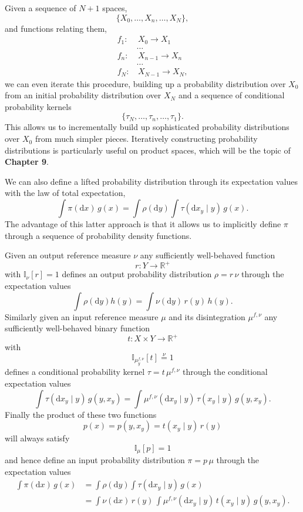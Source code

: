 \documentclass[
  letterpaper,
  DIV=11,
  numbers=noendperiod]{scrartcl}
\begin{document}
Given a sequence of \(N + 1\) spaces, \[
\{ X_{0}, \ldots, X_{n}, \ldots, X_{N} \},
\] and functions relating them, \begin{align*}
f_{1} :& \, X_{0} \rightarrow X_{1}
\\
&\ldots
\\
f_{n} :& \, X_{n - 1} \rightarrow X_{n}
\\
&\ldots
\\
f_{N} :& \, X_{N - 1} \rightarrow X_{N},
\end{align*} we can even iterate this procedure, building up a
probability distribution over \(X_{0}\) from an initial probability
distribution over \(X_{N}\) and a sequence of conditional probability
kernels \[
\{ \tau_{N}, \ldots, \tau_{n}, \ldots, \tau_{1} \}.
\] This allows us to incrementally build up sophisticated probability
distributions over \(X_{0}\) from much simpler pieces. Iteratively
constructing probability distributions is particularly useful on product
spaces, which will be the topic of \textbf{Chapter 9}.

We can also define a lifted probability distribution through its
expectation values with the law of total expectation, \[
\int \pi( \mathrm{d} x ) \, g(x)
=
\int \rho (\mathrm{d} y)
\int \tau( \mathrm{d}x_{y} \mid y ) \, g(x).
\] The advantage of this latter approach is that it allows us to
implicitly define \(\pi\) through a sequence of probability density
functions.

Given an output reference measure \(\nu\) any sufficiently well-behaved
function \[
r : Y \rightarrow \mathbb{R}^{+}
\] with \(\mathbb{I}_{\nu}[ r ] = 1\) defines an output probability
distribution \(\rho = r \, \nu\) through the expectation values \[
\int \rho( \mathrm{d} y ) h(y)
=
\int \nu (\mathrm{d} y) \, r(y) \, h(y).
\] Similarly given an input reference measure \(\mu\) and its
disintegration \(\mu^{f, \nu}\) any sufficiently well-behaved binary
function \[
t : X \times Y \rightarrow \mathbb{R}^{+}
\] with \[
\mathbb{I}_{\mu^{f, \nu}_{y}}[ t ] \overset{\nu}{=} 1
\] defines a conditional probability kernel \(\tau = t \, \mu^{f, \nu}\)
through the conditional expectation values \[
\int \tau( \mathrm{d} x_{y} \mid y) \, g(y, x_{y})
=
\int \mu^{f, \nu}( \mathrm{d} x_{y} \mid y) \,
     \tau(x_{y} \mid y) \, g(y, x_{y}).
\] Finally the product of these two functions \[
p(x) = p(y, x_{y}) = t(x_{y} \mid y ) \, r( y )
\] will always satisfy \[
\mathbb{I}_{\mu} [ p ] = 1
\] and hence define an input probability distribution \(\pi = p \, \mu\)
through the expectation values \begin{align*}
\int \pi( \mathrm{d}x ) \, g(x)
&=
\int \rho (\mathrm{d}y)
\int \tau( \mathrm{d}x_{y} \mid y ) \, g(x)
\\
&=
\int \nu (\mathrm{d}x ) \, r(y) \,
\int \mu^{f, \nu}( \mathrm{d}x_{y} \mid y) \,
t(x_{y} \mid y) \, g(y, x_{y}).
\end{align*}
\end{document}
